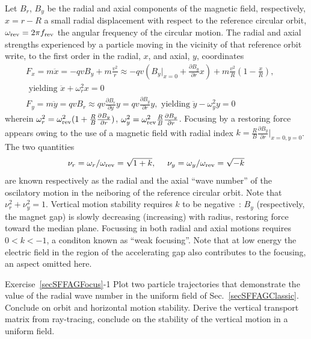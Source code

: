 Let $B_r$, $B_y$  be the radial and axial components of the magnetic field, respectively, 
$x=r-R$ a small radial displacement with respect to the reference circular orbit,  
$\omega_{\rm rev} = 2\pi f_{\rm rev} $ the angular frequency of the circular motion. 
The radial and axial  strengths experienced by a particle moving in the vicinity of that reference orbit 
write, to the first order in the radial, $x$,  and axial, $y$, coordinates 
\begin{eqnarray}
\label{EqCycloFoc}
F_x = m \ddot x=  -qvB_y + m\frac{v^2}{r} \approx -q v (B_y|_{x=0} + \frac{\partial B_y}{\partial r}x)  + m\frac{v^2}{R}(1-\frac{x}{R}), & \nonumber \\ 
\textrm{~yielding~}  \ddot x + \omega_r^2 x=0 &  \nonumber \\
F_y= m\ddot y =   qvB_r \approx q v \frac{\partial B_r}{\partial y} y = q v \frac{\partial B_y}{\partial r} y, 
 \textrm{~yielding~}    \ddot{y} - \omega_y^2 y= 0  & ~ ~ ~ 
\end{eqnarray}
wherein 
$\omega_r^2 = \omega_{\rm rev}^2(1+\frac{R}{B}\frac{\partial B_y}{\partial r})$,  
$ \omega_y^2 = \omega_{\rm rev}^2 \frac{R}{B} \frac{\partial B_y}{\partial r}$. 
Focusing by a restoring force appears owing to the use of a magnetic field with radial 
index $k = \frac{R}{B}\frac{\partial B_y}{\partial r}|_{x=0,y=0}$. 
The two quantities 
\begin{equation}
  \nu_r = \omega_r/\omega_{\rm rev} = \sqrt{1+k},   ~ ~ ~ ~ 
 \nu_y=\omega_y /\omega_{\rm rev}  = \sqrt{-k} 
\end{equation}
are known  respectively as the radial and the axial ``wave number'' of 
the oscilatory motion in the neiboring of the reference circular orbit.
Note that $\nu_r^2 + \nu_y^2=1$.
Vertical motion stability requires $k$ to be negative~:  $B_y$ (respectively, the magnet gap) 
is slowly  decreasing (increasing) with radius, restoring force toward the 
median plane. 
Focussing in both radial and axial motions requires $0 < k <-1$, a conditon known as ``weak focusing''.
 Note that  at low energy  the electric field in the 
region of the accelerating gap also contributes to the focusing, an aspect omitted here. 


\smallskip
\noindent {\small $\bullet$} Exercise~\ref{secSFFAGFocus}-1
Plot two particle trajectories that demonstrate the value of the radial wave number in the uniform 
field of Sec.~\ref{secSFFAGClassic}. Conclude on orbit and horizontal motion  stability. 
Derive the  vertical  transport matrix from ray-tracing, conclude on the stability of the vertical motion
in a uniform field.


